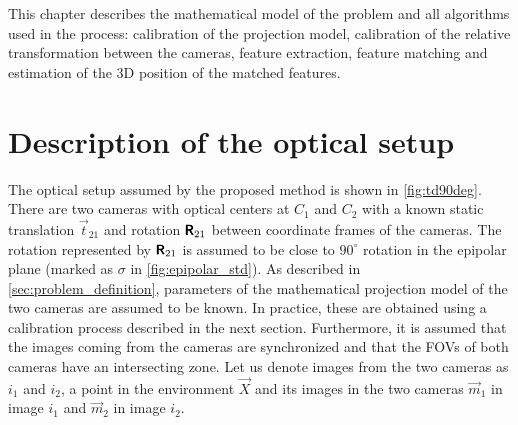 This chapter describes the mathematical model of the problem and all algorithms used in the process: calibration of the projection model, calibration of the relative transformation between the cameras, feature extraction, feature matching and estimation of the 3D position of the matched features.

\section{Description of the optical setup}

The optical setup assumed by the proposed method is shown in \autoref{fig:td90deg}.
There are two cameras with optical centers at $C_1$ and $C_2$ with a known static translation $\vec{t}_{21}$ and rotation $\pmb{\mathsf{R}}_{21}$ between coordinate frames of the cameras.
The rotation represented by $\pmb{\mathsf{R}}_{21}$ is assumed to be close to $90^\circ$ rotation in the epipolar plane (marked as $\sigma$ in \autoref{fig:epipolar_std}).
As described in \autoref{sec:problem_definition}, parameters of the mathematical projection model of the two cameras are assumed to be known. 
In practice, these are obtained using a calibration process described in the next section.
Furthermore, it is assumed that the images coming from the cameras are synchronized and that the FOVs of both cameras have an intersecting zone.
Let us denote images from the two cameras as $i_1$ and $i_2$, a point in the environment $\vec{X}$ and its images in the two cameras $\vec{m}_1$ in image $i_1$ and $\vec{m}_2$ in image $i_2$.

